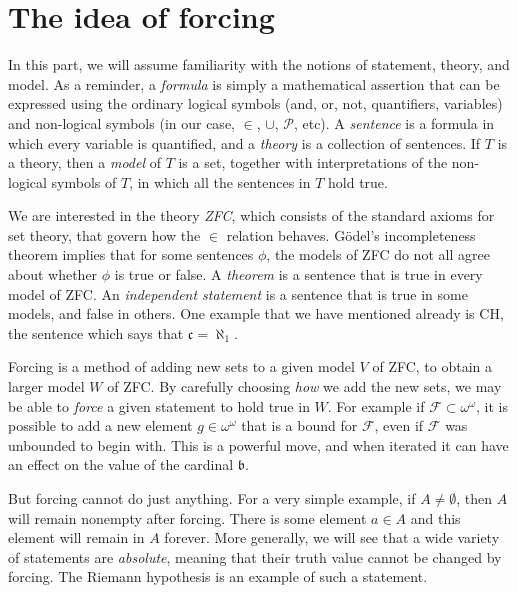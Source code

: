 \documentclass[11pt,oneside,a4paper]{amsbook}
\theoremstyle{definition}
\theoremstyle{plain}
\theoremstyle{definition}
\theoremstyle{remark}
\numberwithin{equation}{section}
\numberwithin{figure}{section}
\begin{document}
\section{The idea of forcing}
\label{sec:idea-forcing}

In this part, we will assume familiarity with the notions of statement, theory, and model. As a reminder, a \emph{formula} is simply a mathematical assertion that can be expressed using the ordinary logical symbols (and, or, not, quantifiers, variables) and non-logical symbols (in our case, $\in$, $\cup$, $\mathcal P$, etc). A \emph{sentence} is a formula in which every variable is quantified, and a \emph{theory} is a collection of sentences. If $T$ is a theory, then a \emph{model} of $T$ is a set, together with interpretations of the non-logical symbols of $T$, in which all the sentences in $T$ hold true.

We are interested in the theory \emph{ZFC}, which consists of the standard axioms for set theory, that govern how the $\in$ relation behaves. G\"odel's incompleteness theorem implies that for some sentences $\phi$, the models of ZFC do not all agree about whether $\phi$ is true or false. A \emph{theorem} is a sentence that is true in every model of ZFC. An \emph{independent statement} is a sentence that is true in some models, and false in others. One example that we have mentioned already is CH, the sentence which says that $\mathfrak c=\aleph_1$.


Forcing is a method of adding new sets to a given model $V$ of ZFC, to obtain a larger model $W$ of ZFC. By carefully choosing \emph{how} we add the new sets, we may be able to \emph{force} a given statement to hold true in $W$. For example if $\mathcal F\subset\omega^\omega$, it is possible to add a new element $g\in\omega^\omega$ that is a bound for $\mathcal F$, even if $\mathcal F$ was unbounded to begin with. This is a powerful move, and when iterated it can have an effect on the value of the cardinal $\mathfrak b$.

But forcing cannot do just anything. For a very simple example, if $A\neq\emptyset$, then $A$ will remain nonempty after forcing. There is some element $a\in A$ and this element will remain in $A$ forever. More generally, we will see that a wide variety of statements are \emph{absolute}, meaning that their truth value cannot be changed by forcing. The Riemann hypothesis is an example of such a statement.
\end{document}
